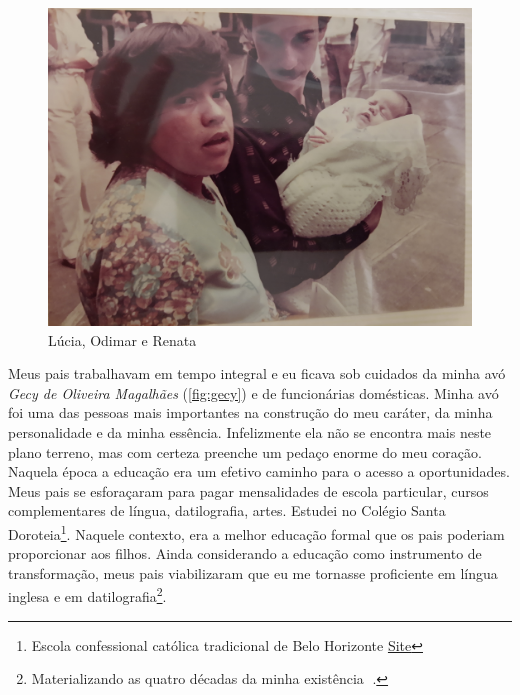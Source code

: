 \documentclass[
]{book}
\begin{document}
\begin{figure}
\centering
\includegraphics{img/pais.jpg}
\caption{\label{fig:pais}Lúcia, Odimar e Renata}
\end{figure}

Meus pais trabalhavam em tempo integral e eu ficava sob cuidados da minha avó \emph{Gecy de Oliveira Magalhães} (\ref{fig:gecy}) e de funcionárias domésticas. Minha avó foi uma das pessoas mais importantes na construção do meu caráter, da minha personalidade e da minha essência. Infelizmente ela não se encontra mais neste plano terreno, mas com certeza preenche um pedaço enorme do meu coração. Naquela época a educação era um efetivo caminho para o acesso a oportunidades. Meus pais se esforaçaram para pagar mensalidades de escola particular, cursos complementares de língua, datilografia, artes. Estudei no Colégio Santa Doroteia\footnote{Escola confessional católica tradicional de Belo Horizonte \href{https://santadoroteia.com.br}{Site}}. Naquele contexto, era a melhor educação formal que os pais poderiam proporcionar aos filhos. Ainda considerando a educação como instrumento de transformação, meus pais viabilizaram que eu me tornasse proficiente em língua inglesa e em datilografia\footnote{Materializando as quatro décadas da minha existência 🥰.}.
\end{document}
